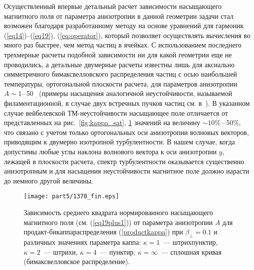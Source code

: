 Осуществленный впервые детальный расчет зависимости насыщающего магнитного поля от параметра анизотропии в данной геометрии задачи стал возможен благодаря разработанному методу на основе уравнений для гармоник (\ref{eq14})--(\ref{eq19}), (\ref{eq:operator}), который позволяет осуществлять вычисления во много раз быстрее, чем метод частиц в ячейках. С использованием последнего трехмерные расчеты подобной зависимости ни для какой геометрии еще не проводились, а детальные двумерные расчеты известны лишь для аксиально симметричного бимаксвелловского распределения частиц с осью наибольшей температуры, ортогональной плоскости расчета, для параметров анизотропии $A \sim 1$--\,50~\cite{Kato2005, Borodachev2010} (примеры насыщения аналогичной неустойчивости, называемой филаментационной, в случае двух встречных пучков частиц см. в~\cite{Dieckmann2009,Ruyer2015}). В указанном случае вейбелевской ТМ-неустойчивости насыщающее поле отличается от представленных на рис.~\ref{fig:kappa_sat}, \ref{fig:pr_kappa_sat} значений на величину $\sim \! 10\%$\,--\,50\%, что связано с учетом только ортогональных оси анизотропии волновых векторов, приводящим к двумерно изотропной турбулентности. В нашем случае, когда допустимы любые углы наклона волнового вектора к оси анизотропии $y$, лежащей в плоскости расчета, спектр турбулентности оказывается существенно анизотропным и для насыщения неустойчивости магнитное поле должно нарасти до немного другой величины.
\begin{figure}[h]

\texttt{[image: part5/1370\_fin.eps]}
\caption{Зависимость среднего квадрата нормированного насыщающего магнитного поля (см. (\ref{eq19plus1}))  от параметра анизотропии $A$ для продакт-бикаппа{\PunctumKappa}распределения (\ref{productkappa}) при $\beta_\perp=0.1$ и различных значениях параметра каппа: $\kappa=1$~--- штрихпунктир, $\kappa=2$~--- штрихи, $\kappa=4$~--- пунктир, $\kappa=\infty$~--- сплошная кривая (бимаксвелловское распределение).}
\label{fig:pr_kappa_sat}
\end{figure}

